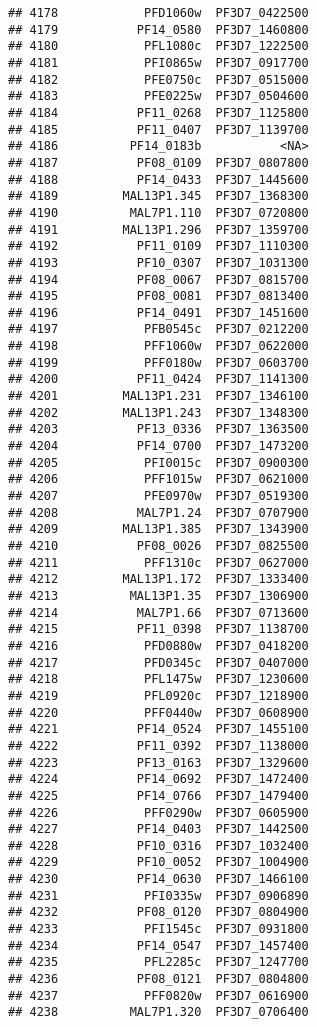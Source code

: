 \documentclass[12pt, a4paper]{article}\usepackage[]{graphicx}\usepackage[]{color}
\makeatletter
\newenvironment{kframe}{%
 \def\at@end@of@kframe{}%
 \ifinner\ifhmode%
  \def\at@end@of@kframe{\end{minipage}}%
  \begin{minipage}{\columnwidth}%
 \fi\fi%
 \def\FrameCommand##1{\hskip\@totalleftmargin \hskip-\fboxsep
 \colorbox{shadecolor}{##1}\hskip-\fboxsep
     \hskip-\linewidth \hskip-\@totalleftmargin \hskip\columnwidth}%
 \MakeFramed {\advance\hsize-\width
   \@totalleftmargin\z@ \linewidth\hsize
   \@setminipage}}%
 {\par\unskip\endMakeFramed%
 \at@end@of@kframe}
\newenvironment{knitrout}{}{} %
\makeatother
\begin{document}
\begin{knitrout}
\begin{kframe}
\begin{verbatim}
## 4178            PFD1060w  PF3D7_0422500
## 4179           PF14_0580  PF3D7_1460800
## 4180            PFL1080c  PF3D7_1222500
## 4181            PFI0865w  PF3D7_0917700
## 4182            PFE0750c  PF3D7_0515000
## 4183            PFE0225w  PF3D7_0504600
## 4184           PF11_0268  PF3D7_1125800
## 4185           PF11_0407  PF3D7_1139700
## 4186          PF14_0183b           <NA>
## 4187           PF08_0109  PF3D7_0807800
## 4188           PF14_0433  PF3D7_1445600
## 4189         MAL13P1.345  PF3D7_1368300
## 4190          MAL7P1.110  PF3D7_0720800
## 4191         MAL13P1.296  PF3D7_1359700
## 4192           PF11_0109  PF3D7_1110300
## 4193           PF10_0307  PF3D7_1031300
## 4194           PF08_0067  PF3D7_0815700
## 4195           PF08_0081  PF3D7_0813400
## 4196           PF14_0491  PF3D7_1451600
## 4197            PFB0545c  PF3D7_0212200
## 4198            PFF1060w  PF3D7_0622000
## 4199            PFF0180w  PF3D7_0603700
## 4200           PF11_0424  PF3D7_1141300
## 4201         MAL13P1.231  PF3D7_1346100
## 4202         MAL13P1.243  PF3D7_1348300
## 4203           PF13_0336  PF3D7_1363500
## 4204           PF14_0700  PF3D7_1473200
## 4205            PFI0015c  PF3D7_0900300
## 4206            PFF1015w  PF3D7_0621000
## 4207            PFE0970w  PF3D7_0519300
## 4208           MAL7P1.24  PF3D7_0707900
## 4209         MAL13P1.385  PF3D7_1343900
## 4210           PF08_0026  PF3D7_0825500
## 4211            PFF1310c  PF3D7_0627000
## 4212         MAL13P1.172  PF3D7_1333400
## 4213          MAL13P1.35  PF3D7_1306900
## 4214           MAL7P1.66  PF3D7_0713600
## 4215           PF11_0398  PF3D7_1138700
## 4216            PFD0880w  PF3D7_0418200
## 4217            PFD0345c  PF3D7_0407000
## 4218            PFL1475w  PF3D7_1230600
## 4219            PFL0920c  PF3D7_1218900
## 4220            PFF0440w  PF3D7_0608900
## 4221           PF14_0524  PF3D7_1455100
## 4222           PF11_0392  PF3D7_1138000
## 4223           PF13_0163  PF3D7_1329600
## 4224           PF14_0692  PF3D7_1472400
## 4225           PF14_0766  PF3D7_1479400
## 4226            PFF0290w  PF3D7_0605900
## 4227           PF14_0403  PF3D7_1442500
## 4228           PF10_0316  PF3D7_1032400
## 4229           PF10_0052  PF3D7_1004900
## 4230           PF14_0630  PF3D7_1466100
## 4231            PFI0335w  PF3D7_0906890
## 4232           PF08_0120  PF3D7_0804900
## 4233            PFI1545c  PF3D7_0931800
## 4234           PF14_0547  PF3D7_1457400
## 4235            PFL2285c  PF3D7_1247700
## 4236           PF08_0121  PF3D7_0804800
## 4237            PFF0820w  PF3D7_0616900
## 4238          MAL7P1.320  PF3D7_0706400

\end{verbatim}
\end{kframe}
\end{knitrout}
\end{document}
